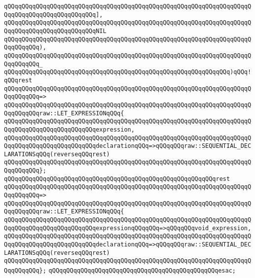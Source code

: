 \verb|qQQqqQQqqQQqqQQqqQQqqQQqqQQqqQQqqQQqqQQqqQQqqQQqqQQqqQQqqQQqqQQqqQQqqQQqqQQqqQQqqQQqqQQqqQQqqQQq],|\newline
\verb|qQQqqQQqqQQqqQQqqQQqqQQqqQQqqQQqqQQqqQQqqQQqqQQqqQQqqQQqqQQqqQQqqQQqqQQqqQQqqQQqqQQqqQQqqQQqqQQqNIL|\newline
\verb|qQQqqQQqqQQqqQQqqQQqqQQqqQQqqQQqqQQqqQQqqQQqqQQqqQQqqQQqqQQqqQQqqQQqqQQqqQQqqQQq),|\newline
\verb|qQQqqQQqqQQqqQQqqQQqqQQqqQQqqQQqqQQqqQQqqQQqqQQqqQQqqQQqqQQqqQQqqQQqqQQqqQQqqQQq_|\newline
\verb|qQQqqQQqqQQqqQQqqQQqqQQqqQQqqQQqqQQqqQQqqQQqqQQqqQQqqQQqqQQqqQQq)qQQq!qQQqrest|\newline
\verb|qQQqqQQqqQQqqQQqqQQqqQQqqQQqqQQqqQQqqQQqqQQqqQQqqQQqqQQqqQQqqQQqqQQqqQQqqQQqqQQq=>|\newline
\verb|qQQqqQQqqQQqqQQqqQQqqQQqqQQqqQQqqQQqqQQqqQQqqQQqqQQqqQQqqQQqqQQqqQQqqQQqqQQqqQQqraw::LET_EXPRESSIONqQQq{|\newline
\verb|qQQqqQQqqQQqqQQqqQQqqQQqqQQqqQQqqQQqqQQqqQQqqQQqqQQqqQQqqQQqqQQqqQQqqQQqqQQqqQQqqQQqqQQqqQQqqQQqexpression,|\newline
\verb|qQQqqQQqqQQqqQQqqQQqqQQqqQQqqQQqqQQqqQQqqQQqqQQqqQQqqQQqqQQqqQQqqQQqqQQqqQQqqQQqqQQqqQQqqQQqqQQqdeclarationqQQq=>qQQqqQQqraw::SEQUENTIAL_DECLARATIONSqQQq(reverseqQQqrest)|\newline
\verb|qQQqqQQqqQQqqQQqqQQqqQQqqQQqqQQqqQQqqQQqqQQqqQQqqQQqqQQqqQQqqQQqqQQqqQQqqQQqqQQq};|\newline
\newline
\verb|qQQqqQQqqQQqqQQqqQQqqQQqqQQqqQQqqQQqqQQqqQQqqQQqqQQqqQQqqQQqrest|\newline
\verb|qQQqqQQqqQQqqQQqqQQqqQQqqQQqqQQqqQQqqQQqqQQqqQQqqQQqqQQqqQQqqQQqqQQqqQQqqQQqqQQq=>|\newline
\verb|qQQqqQQqqQQqqQQqqQQqqQQqqQQqqQQqqQQqqQQqqQQqqQQqqQQqqQQqqQQqqQQqqQQqqQQqqQQqqQQqraw::LET_EXPRESSIONqQQq{|\newline
\verb|qQQqqQQqqQQqqQQqqQQqqQQqqQQqqQQqqQQqqQQqqQQqqQQqqQQqqQQqqQQqqQQqqQQqqQQqqQQqqQQqqQQqqQQqqQQqqQQqexpressionqQQqqQQq=>qQQqqQQqvoid_expression,|\newline
\verb|qQQqqQQqqQQqqQQqqQQqqQQqqQQqqQQqqQQqqQQqqQQqqQQqqQQqqQQqqQQqqQQqqQQqqQQqqQQqqQQqqQQqqQQqqQQqqQQqdeclarationqQQq=>qQQqqQQqraw::SEQUENTIAL_DECLARATIONSqQQq(reverseqQQqrest)|\newline
\verb|qQQqqQQqqQQqqQQqqQQqqQQqqQQqqQQqqQQqqQQqqQQqqQQqqQQqqQQqqQQqqQQqqQQqqQQqqQQqqQQq};|\newline
\verb|qQQqqQQqqQQqqQQqqQQqqQQqqQQqqQQqqQQqqQQqqQQqqQQqesac;|\newline
